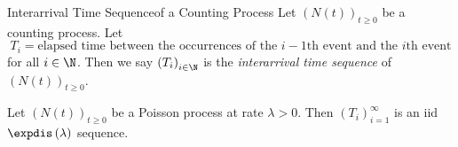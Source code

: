 \documentclass[stat333]{subfiles}
\begin{document}
    \begin{definition}{Interarrival Time Sequence}{of a Counting Process}
        Let $\left( N\left( t \right) \right)^{}_{t\geq 0}$ be a counting process. Let
        \begin{equation*}
            T_i = \text{elapsed time between the occurrences of the $i-1$th event and the $i$th event}
        \end{equation*}
        for all $i\in\N$. Then we say $\left( T_{i} \right)^{}_{i\in\N}$ is the \emph{interarrival time sequence} of $\left( N\left( t \right) \right)^{}_{t\geq 0}$.
    \end{definition}

    \begin{prop}{}
        Let $\left( N\left( t \right) \right)^{}_{t\geq 0}$ be a Poisson process at rate $\lambda>0$. Then $\left( T_{i} \right)^{\infty}_{i=1}$ is an iid $\expdis\left( \lambda \right)$ sequence.
    \end{prop}
\end{document}
